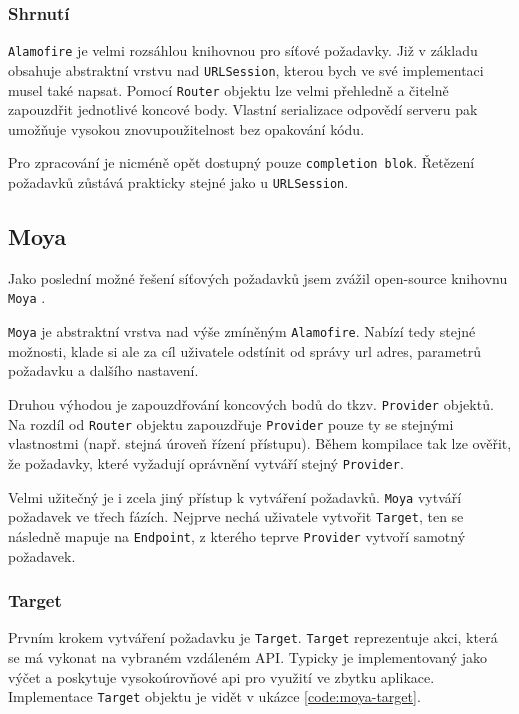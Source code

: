 \subsubsection*{Shrnutí}

\texttt{Alamofire} je velmi rozsáhlou knihovnou pro síťové požadavky.
Již v základu obsahuje abstraktní vrstvu nad \texttt{URLSession}, kterou bych ve své implementaci musel také napsat.
Pomocí \texttt{Router} objektu lze velmi přehledně a čitelně zapouzdřit jednotlivé koncové body.
Vlastní serializace odpovědí serveru pak umožňuje vysokou znovupoužitelnost bez opakování kódu.

Pro zpracování je nicméně opět dostupný pouze \texttt{completion blok}.
Řetězení požadavků zůstává prakticky stejné jako u \texttt{URLSession}.

\subsection{Moya}

Jako poslední možné řešení síťových požadavků jsem zvážil open-source knihovnu \texttt{Moya} \cite{github-moya}.

\texttt{Moya} je abstraktní vrstva nad výše zmíněným \texttt{Alamofire}.
Nabízí tedy stejné možnosti, klade si ale za cíl uživatele odstínit od správy \acrshort{url} adres, parametrů požadavku a dalšího nastavení.

Druhou výhodou je zapouzdřování koncových bodů do tkzv. \texttt{Provider} objektů.
Na rozdíl od \texttt{Router} objektu zapouzdřuje \texttt{Provider} pouze ty se stejnými vlastnostmi (např. stejná úroveň řízení přístupu).
Během kompilace tak lze ověřit, že požadavky, které vyžadují oprávnění vytváří stejný \texttt{Provider}.

\medskip

Velmi užitečný je i zcela jiný přístup k vytváření požadavků.
\texttt{Moya} vytváří požadavek ve třech fázích.
Nejprve nechá uživatele vytvořit \texttt{Target}, ten se následně mapuje na \texttt{Endpoint}, z kterého teprve \texttt{Provider} vytvoří samotný požadavek.

\subsubsection*{Target}

Prvním krokem vytváření požadavku je \texttt{Target}.
\texttt{Target} reprezentuje akci, která se má vykonat na vybraném vzdáleném API.
Typicky je implementovaný jako výčet a poskytuje vysokoúrovňové \acrshort{api} pro využití ve zbytku aplikace.
Implementace \texttt{Target} objektu je vidět v ukázce \ref{code:moya-target}.

